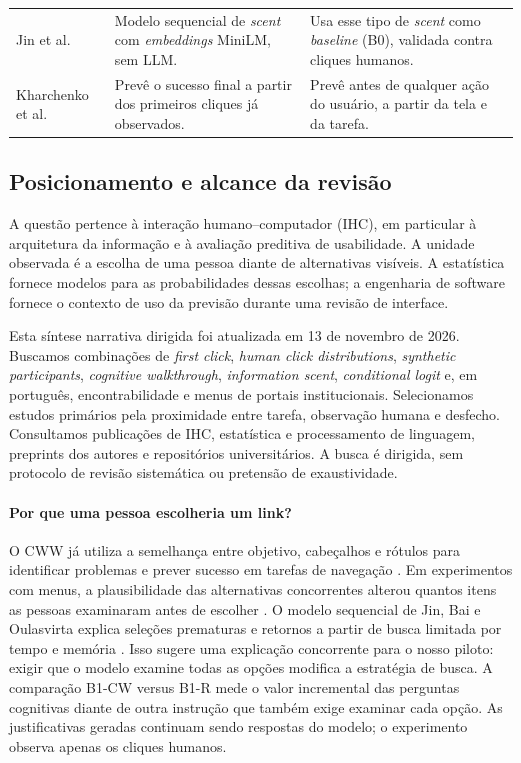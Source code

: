 \documentclass[12pt]{article}
\begin{document}
\begin{table}[ht]
\begin{tabularx}{\textwidth}{@{}p{2.6cm}YY@{}}
Jin et al. \cite{jin2026scent} & Modelo sequencial de \textit{scent} com \textit{embeddings} MiniLM, sem LLM. & Usa esse tipo de \textit{scent} como \textit{baseline} (B0), validada contra cliques humanos. \\
Kharchenko et al. \cite{kharchenko2026early} & Prevê o sucesso final a partir dos primeiros cliques já observados. & Prevê antes de qualquer ação do usuário, a partir da tela e da tarefa. \\
\bottomrule
\end{tabularx}
\end{table}

\subsection{Posicionamento e alcance da revisão}
\label{sec:diferenciais}
A questão pertence à interação humano--computador (IHC), em particular à arquitetura da informação e à avaliação preditiva de usabilidade. A unidade observada é a escolha de uma pessoa diante de alternativas visíveis. A estatística fornece modelos para as probabilidades dessas escolhas; a engenharia de software fornece o contexto de uso da previsão durante uma revisão de interface.

Esta síntese narrativa dirigida foi atualizada em 13 de novembro de 2026. Buscamos combinações de \emph{first click}, \emph{human click distributions}, \emph{synthetic participants}, \emph{cognitive walkthrough}, \emph{information scent}, \emph{conditional logit} e, em português, encontrabilidade e menus de portais institucionais. Selecionamos estudos primários pela proximidade entre tarefa, observação humana e desfecho. Consultamos publicações de IHC, estatística e processamento de linguagem, preprints dos autores e repositórios universitários. A busca é dirigida, sem protocolo de revisão sistemática ou pretensão de exaustividade.

\paragraph{Por que uma pessoa escolheria um link?} O CWW já utiliza a semelhança entre objetivo, cabeçalhos e rótulos para identificar problemas e prever sucesso em tarefas de navegação \cite{blackmon2002cww}. Em experimentos com menus, a plausibilidade das alternativas concorrentes alterou quantos itens as pessoas examinaram antes de escolher \cite{brumby2008}. O modelo sequencial de Jin, Bai e Oulasvirta explica seleções prematuras e retornos a partir de busca limitada por tempo e memória \cite{jin2026scent}. Isso sugere uma explicação concorrente para o nosso piloto: exigir que o modelo examine todas as opções modifica a estratégia de busca. A comparação B1-CW versus B1-R mede o valor incremental das perguntas cognitivas diante de outra instrução que também exige examinar cada opção. As justificativas geradas continuam sendo respostas do modelo; o experimento observa apenas os cliques humanos.
\end{document}
